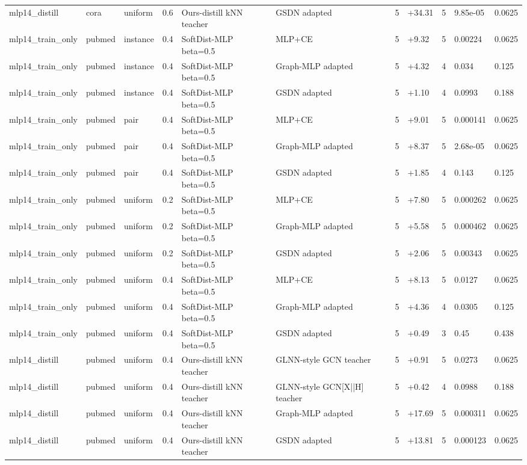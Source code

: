 \begin{table}[t]
\begin{tabular}{llllllrlrll}
mlp14_distill & cora & uniform & 0.6 & Ours-distill kNN teacher & GSDN adapted & 5 & +34.31 & 5 & 9.85e-05 & 0.0625 \\
mlp14_train_only & pubmed & instance & 0.4 & SoftDist-MLP beta=0.5 & MLP+CE & 5 & +9.32 & 5 & 0.00224 & 0.0625 \\
mlp14_train_only & pubmed & instance & 0.4 & SoftDist-MLP beta=0.5 & Graph-MLP adapted & 5 & +4.32 & 4 & 0.034 & 0.125 \\
mlp14_train_only & pubmed & instance & 0.4 & SoftDist-MLP beta=0.5 & GSDN adapted & 5 & +1.10 & 4 & 0.0993 & 0.188 \\
mlp14_train_only & pubmed & pair & 0.4 & SoftDist-MLP beta=0.5 & MLP+CE & 5 & +9.01 & 5 & 0.000141 & 0.0625 \\
mlp14_train_only & pubmed & pair & 0.4 & SoftDist-MLP beta=0.5 & Graph-MLP adapted & 5 & +8.37 & 5 & 2.68e-05 & 0.0625 \\
mlp14_train_only & pubmed & pair & 0.4 & SoftDist-MLP beta=0.5 & GSDN adapted & 5 & +1.85 & 4 & 0.143 & 0.125 \\
mlp14_train_only & pubmed & uniform & 0.2 & SoftDist-MLP beta=0.5 & MLP+CE & 5 & +7.80 & 5 & 0.000262 & 0.0625 \\
mlp14_train_only & pubmed & uniform & 0.2 & SoftDist-MLP beta=0.5 & Graph-MLP adapted & 5 & +5.58 & 5 & 0.000462 & 0.0625 \\
mlp14_train_only & pubmed & uniform & 0.2 & SoftDist-MLP beta=0.5 & GSDN adapted & 5 & +2.06 & 5 & 0.00343 & 0.0625 \\
mlp14_train_only & pubmed & uniform & 0.4 & SoftDist-MLP beta=0.5 & MLP+CE & 5 & +8.13 & 5 & 0.0127 & 0.0625 \\
mlp14_train_only & pubmed & uniform & 0.4 & SoftDist-MLP beta=0.5 & Graph-MLP adapted & 5 & +4.36 & 4 & 0.0305 & 0.125 \\
mlp14_train_only & pubmed & uniform & 0.4 & SoftDist-MLP beta=0.5 & GSDN adapted & 5 & +0.49 & 3 & 0.45 & 0.438 \\
mlp14_distill & pubmed & uniform & 0.4 & Ours-distill kNN teacher & GLNN-style GCN teacher & 5 & +0.91 & 5 & 0.0273 & 0.0625 \\
mlp14_distill & pubmed & uniform & 0.4 & Ours-distill kNN teacher & GLNN-style GCN[X||H] teacher & 5 & +0.42 & 4 & 0.0988 & 0.188 \\
mlp14_distill & pubmed & uniform & 0.4 & Ours-distill kNN teacher & Graph-MLP adapted & 5 & +17.69 & 5 & 0.000311 & 0.0625 \\
mlp14_distill & pubmed & uniform & 0.4 & Ours-distill kNN teacher & GSDN adapted & 5 & +13.81 & 5 & 0.000123 & 0.0625 \\

\end{tabular}
\end{table}
